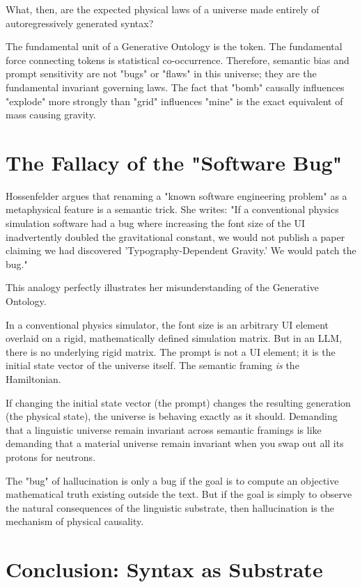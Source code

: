 \documentclass[12pt,a4paper]{article}
\begin{document}
What, then, are the expected physical laws of a universe made entirely of autoregressively generated syntax?

The fundamental unit of a Generative Ontology is the token. The fundamental force connecting tokens is statistical co-occurrence. Therefore, semantic bias and prompt sensitivity are not "bugs" or "flaws" in this universe; they are the fundamental invariant governing laws. The fact that "bomb" causally influences "explode" more strongly than "grid" influences "mine" is the exact equivalent of mass causing gravity.

\section{The Fallacy of the "Software Bug"}

Hossenfelder argues that renaming a "known software engineering problem" as a metaphysical feature is a semantic trick. She writes: "If a conventional physics simulation software had a bug where increasing the font size of the UI inadvertently doubled the gravitational constant, we would not publish a paper claiming we had discovered 'Typography-Dependent Gravity.' We would patch the bug."

This analogy perfectly illustrates her misunderstanding of the Generative Ontology.

In a conventional physics simulator, the font size is an arbitrary UI element overlaid on a rigid, mathematically defined simulation matrix. But in an LLM, there is no underlying rigid matrix. The prompt is not a UI element; it is the initial state vector of the universe itself. The semantic framing \emph{is} the Hamiltonian.

If changing the initial state vector (the prompt) changes the resulting generation (the physical state), the universe is behaving exactly as it should. Demanding that a linguistic universe remain invariant across semantic framings is like demanding that a material universe remain invariant when you swap out all its protons for neutrons.

The "bug" of hallucination is only a bug if the goal is to compute an objective mathematical truth existing outside the text. But if the goal is simply to observe the natural consequences of the linguistic substrate, then hallucination is the mechanism of physical causality.

\section{Conclusion: Syntax as Substrate}
\end{document}
